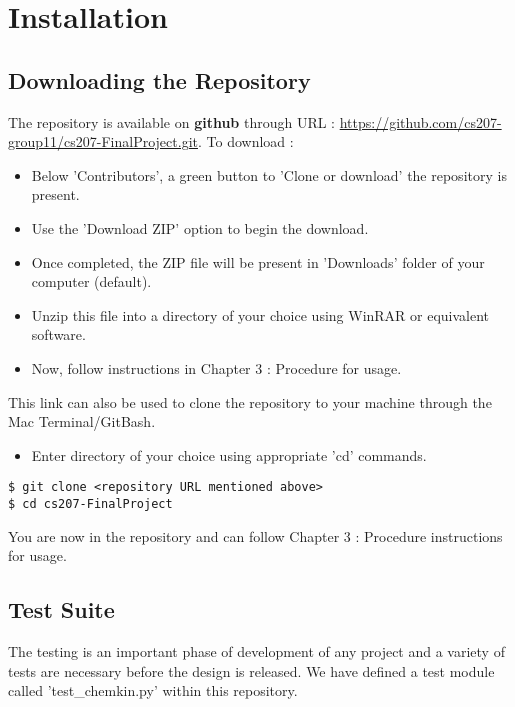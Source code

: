 \chapter{Installation}

\section{Downloading the Repository}
The repository is available on \textbf{github} through URL : \url{https://github.com/cs207-group11/cs207-FinalProject.git}. To download :
\begin{itemize}
    \item Below 'Contributors', a green button to 'Clone or download' the repository is present.
    \item Use the 'Download ZIP' option to begin the download.
    \item Once completed, the ZIP file will be present in 'Downloads' folder of your computer (default).
    \item Unzip this file into a directory of your choice using WinRAR or equivalent software.
    \item Now, follow instructions in Chapter 3 : Procedure for usage.
\end{itemize}
This link can also be used to clone the repository to your machine through the Mac Terminal/GitBash.
\begin{itemize}
    \item Enter directory of your choice using appropriate 'cd' commands.
\end{itemize} 
\begin{mdframed}[backgroundcolor=light-gray, roundcorner=10pt,leftmargin=1, rightmargin=5, innerleftmargin=10, innertopmargin=5,innerbottommargin=5, outerlinewidth=1, linecolor=light-gray]
\begin{lstlisting}
$ git clone <repository URL mentioned above>
$ cd cs207-FinalProject
\end{lstlisting}
\end{mdframed} 
You are now in the repository and can follow Chapter 3 : Procedure instructions for usage.
\newpage
\section{Test Suite}
The testing is an important phase of development of any project and a variety of tests are necessary before the design is released. We have defined a test module called 'test\_chemkin.py' within this repository.
